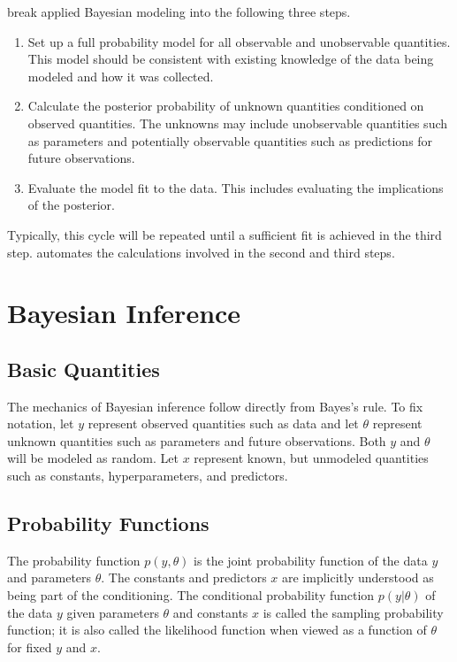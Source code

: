\citep{GelmanEtAl:2013} break applied Bayesian modeling
into the following three steps.
%
\begin{enumerate}
\item  Set up a full probability model for all observable and
  unobservable quantities.  This model should be consistent with
  existing knowledge of the data being modeled and how it was
  collected.
\item Calculate the posterior probability of unknown quantities
  conditioned on observed quantities.  The unknowns may include
  unobservable quantities such as parameters and potentially
  observable quantities such as predictions for future observations.
\item Evaluate the model fit to the data.  This includes evaluating
  the implications of the posterior.
\end{enumerate}
%
Typically, this cycle will be repeated until a sufficient fit is
achieved in the third step.  \Stan automates the calculations involved
in the second and third steps.

\section{Bayesian Inference}

\subsection{Basic Quantities}

The mechanics of Bayesian inference follow directly from Bayes's rule.
To fix notation, let $y$ represent observed quantities such as data
and let $\theta$ represent unknown quantities such as parameters and
future observations.  Both $y$ and $\theta$ will be modeled as random.
Let $x$ represent known, but unmodeled quantities such as constants,
hyperparameters, and predictors.

\subsection{Probability Functions}

The probability function $p(y,\theta)$ is the joint probability
function of the data $y$ and parameters $\theta$.  The constants and
predictors $x$ are implicitly understood as being part of the
conditioning.  The conditional probability function $p(y|\theta)$ of
the data $y$ given parameters $\theta$ and constants $x$ is called the
sampling probability function; it is also called the likelihood
function when viewed as a function of $\theta$ for fixed $y$ and $x$.


